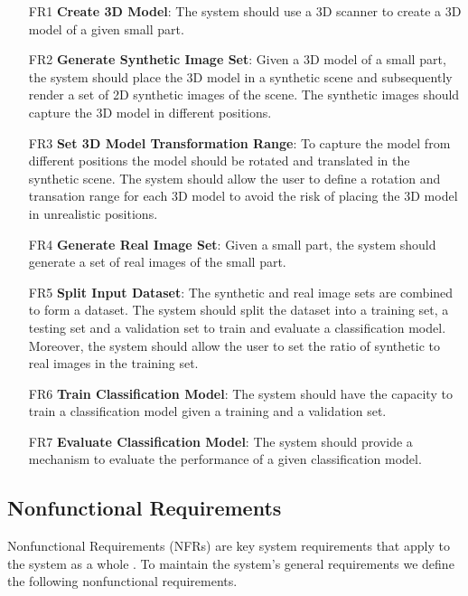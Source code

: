 \begin{itemize}
  \item [FR1] \textbf{Create 3D Model}: The system should use a 3D scanner to create a 3D model of a given small part.

  \item [FR2] \textbf{Generate Synthetic Image Set}: Given a 3D model of a small part, the system should place the 3D model in a synthetic scene and subsequently render a set of 2D synthetic images of the scene. The synthetic images should capture the 3D model in different positions.

  \item [FR3] \textbf{Set 3D Model Transformation Range}: To capture the model from different positions the model should be rotated and translated in the synthetic scene. The system should allow the user to define a rotation and transation range for each 3D model to avoid the risk of placing the 3D model in unrealistic positions.

  \item [FR4] \textbf{Generate Real Image Set}: Given a small part, the system should generate a set of real images of the small part.

  \item [FR5] \textbf{Split Input Dataset}: The synthetic and real image sets are combined to form a dataset. The system should split the dataset into a training set, a testing set and a validation set to train and evaluate a classification model. Moreover, the system should allow the user to set the ratio of synthetic to real images in the training set.

  \item [FR6] \textbf{Train Classification Model}: The system should have the capacity to train a classification model given a training and a validation set.

  \item [FR7] \textbf{Evaluate Classification Model}: The system should provide a mechanism to evaluate the performance of a given classification model.
\end{itemize}

\subsection{Nonfunctional Requirements}
Nonfunctional Requirements (NFRs) are key system requirements that apply to the system as a whole \cite{bruegge2004object}. To maintain the system's general requirements we define the following nonfunctional requirements.

